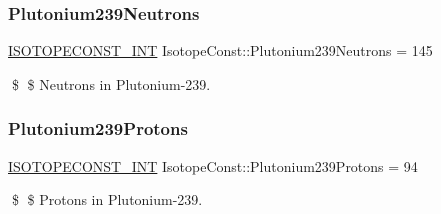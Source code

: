 \subsubsection{\texorpdfstring{Plutonium239\+Neutrons}{Plutonium239Neutrons}}
{\footnotesize\ttfamily \mbox{\hyperlink{group___isotope_const-_macros_ga5f18360b3e99483a35c32d789e62621c}{I\+S\+O\+T\+O\+P\+E\+C\+O\+N\+S\+T\+\_\+\+I\+NT}} Isotope\+Const\+::\+Plutonium239\+Neutrons = 145}

\$ \$ Neutrons in Plutonium-\/239. \mbox{\label{group___isotope_const-_plutonium-_pu239_ga57f4504667662a673f9f68843523f992}} 
\subsubsection{\texorpdfstring{Plutonium239\+Protons}{Plutonium239Protons}}
{\footnotesize\ttfamily \mbox{\hyperlink{group___isotope_const-_macros_ga5f18360b3e99483a35c32d789e62621c}{I\+S\+O\+T\+O\+P\+E\+C\+O\+N\+S\+T\+\_\+\+I\+NT}} Isotope\+Const\+::\+Plutonium239\+Protons = 94}

\$ \$ Protons in Plutonium-\/239. 